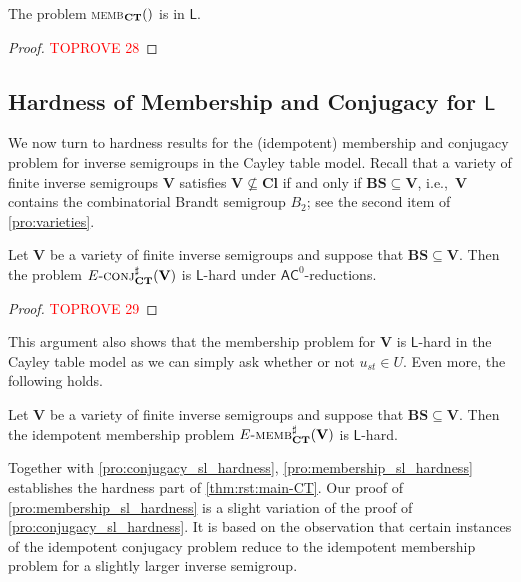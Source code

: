 \documentclass[anonymous,letter,UKenglish,cleveref,autoref,thm-restate]{lipics-v2021}
\newcommand{\ie}{i.e.,~}
\newcommand{\sse}{\subseteq}
\newcommand{\ACz}{\ensuremath{\mathsf{AC}^0}\xspace}
\newcommand{\LOGSPACE}{\ensuremath{\mathsf{L}}\xspace}
\newcommand{\vV}{\ensuremath{\mathbf{V}}}
\newcommand{\vCl}{\ensuremath{\mathbf{Cl}}}
\newcommand{\vBS}{\ensuremath{\mathbf{BS}}}  \newcommand{\vBM}{\ensuremath{\mathbf{BM}}}
\theoremstyle{plain}
\theoremstyle{plain}
\newcommand{\dMemb}[2][]{\textup{\textsc{memb${}_{\mathbf{#1}}\expandafter\ifx\expandafter\relax\detokenize{#2}\relax\else(#2)\fi$}}}
\newcommand{\dMembS}[2][]{\textup{\textsc{memb${}^{\sharp}_{\mathbf{#1}}\expandafter\ifx\expandafter\relax\detokenize{#2}\relax\else(#2)\fi$}}}
\newcommand{\dConjS}[2][]{\textup{\textsc{conj${}^{\sharp}_{\mathbf{#1}}\expandafter\ifx\expandafter\relax\detokenize{#2}\relax\else(#2)\fi$}}}
\newcommand{\dEMembS}[2][]{\ensuremath{E}\textnormal{-}\dMembS[#1]{#2}}
\newcommand{\dEConjS}[2][]{\ensuremath{E}\textnormal{-}\dConjS[#1]{#2}}
\begin{document}
\begin{proposition}\label{thm:InvSGSL}
	The problem \dMemb[CT]{} is in \LOGSPACE.
\end{proposition}


\begin{proof}\textcolor{red}{TOPROVE 28}\end{proof}


\subsection{Hardness of Membership and Conjugacy for \LOGSPACE{}}\label{sec:SL-hard}

We now turn to hardness results for the (idempotent) membership and conjugacy problem for inverse semigroups in the Cayley table model.
Recall that a variety of finite inverse semigroups $\vV$ satisfies $\vV \not\sse \vCl$ if and only if $\vBS \sse \vV$, \ie $\vV$ contains the combinatorial Brandt semigroup $B_2$; see the second item of \cref{pro:varieties}.

\begin{proposition}\label{pro:conjugacy_sl_hardness}
  Let $\vV$ be a variety of finite inverse semigroups and suppose that $\vBS \sse \vV$.
	Then the problem $\dEConjS[CT]{\vV}$ is \LOGSPACE-hard under \ACz-reductions.
\end{proposition}

\begin{proof}\textcolor{red}{TOPROVE 29}\end{proof}

This argument also shows that the membership problem for $\vV$ is \LOGSPACE-hard in the Cayley table model as we can simply ask whether or not $u_{st} \in U$.
Even more, the following holds.

\begin{proposition}\label{pro:membership_sl_hardness}
	Let $\vV$ be a variety of finite inverse semigroups and suppose that $\vBS \sse \vV$.
	Then the idempotent membership problem $\dEMembS[CT]{\vV}$ is \LOGSPACE-hard. 
\end{proposition}

Together with \cref{pro:conjugacy_sl_hardness}, \cref{pro:membership_sl_hardness} establishes the hardness part of \cref{thm:rst:main-CT}.
Our proof of \cref{pro:membership_sl_hardness} is a slight variation of the proof of \cref{pro:conjugacy_sl_hardness}.
It is based on the observation that certain instances of the idempotent conjugacy problem reduce to the idempotent membership problem for a slightly larger inverse semigroup.
\end{document}
